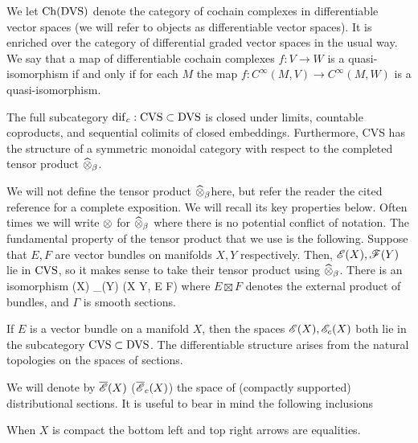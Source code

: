 \documentclass[11pt]{amsart}
\begin{document}
We let ${\rm Ch}({\rm DVS})$ denote the category of cochain complexes in differentiable vector spaces (we will refer to objects as differentiable vector spaces). 
It is enriched over the category of differential graded vector spaces in the usual way.
We say that a map of differentiable cochain complexes $f : V \to W$ is a quasi-isomorphism if and only if for each $M$ the map $f : C^\infty(M, V) \to C^\infty(M,W)$ is a quasi-isomorphism.

\begin{thm}
The full subcategory ${\rm dif}_c : {\rm CVS} \subset {\rm DVS}$ is closed under limits, countable coproducts, and sequential colimits of closed embeddings. 
Furthermore, {\rm CVS} has the structure of a symmetric monoidal category with respect to the completed tensor product $\widehat{\otimes}_{\beta}$. 
\end{thm}

We will not define the tensor product $\widehat{\otimes}_\beta$here, but refer the reader the cited reference for a complete exposition.
We will recall its key properties below.
Often times we will write $\otimes$ for $\widehat{\otimes}_\beta$ where there is no potential conflict of notation. 
The fundamental property of the tensor product that we use is the following.
Suppose that $E,F$ are vector bundles on manifolds $X,Y$ respectively.
Then, $\mathscr E(X), \mathscr F(Y)$ lie in ${\rm CVS}$, so it makes sense to take their tensor product using $\widehat{\otimes}_\beta$. 
There is an isomorphism
\be\label{tensor1}
\sE(X) \Hat{\tensor}_\beta \sF(Y) \cong \Gamma(X \times Y, E \boxtimes F)
\ee
where $E \boxtimes F$ denotes the external product of bundles, and $\Gamma$ is smooth sections. 

If $E$ is a vector bundle on a manifold $X$, then the spaces $\mathscr E(X), \mathscr E_c(X)$ both lie in the subcategory ${\rm CVS} \subset {\rm DVS}$. 
The differentiable structure arises from the natural topologies on the spaces of sections. 

We will denote by $\overline{\mathscr E}(X)$ ($\overline{\mathscr E}_c(X)$) the space of (compactly supported) distributional sections.
It is useful to bear in mind the following inclusions
\ben
{}
\een
When $X$ is compact the bottom left and top right arrows are equalities.
\end{document}
